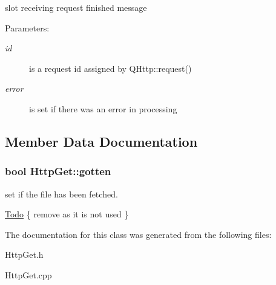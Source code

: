 slot receiving request finished message \begin{Desc}
\item[Parameters:]
\begin{description}
\item[{\em id}]is a request id assigned by QHttp::request() \item[{\em error}]is set if there was an error in processing \end{description}
\end{Desc}


\subsection{Member Data Documentation}
\hypertarget{classHttpGet_f807ab4073ff2e604bb3aea0cc2e121d}{
\subsubsection[gotten]{\setlength{\rightskip}{0pt plus 5cm}bool {\bf HttpGet::gotten}}}
\label{classHttpGet_f807ab4073ff2e604bb3aea0cc2e121d}


set if the file has been fetched. 

\begin{Desc}
\item[\hyperlink{todo__todo000001}{Todo}]\{ remove as it is not used \} \end{Desc}


The documentation for this class was generated from the following files:\begin{CompactItemize}
\item 
HttpGet.h\item 
HttpGet.cpp\end{CompactItemize}
